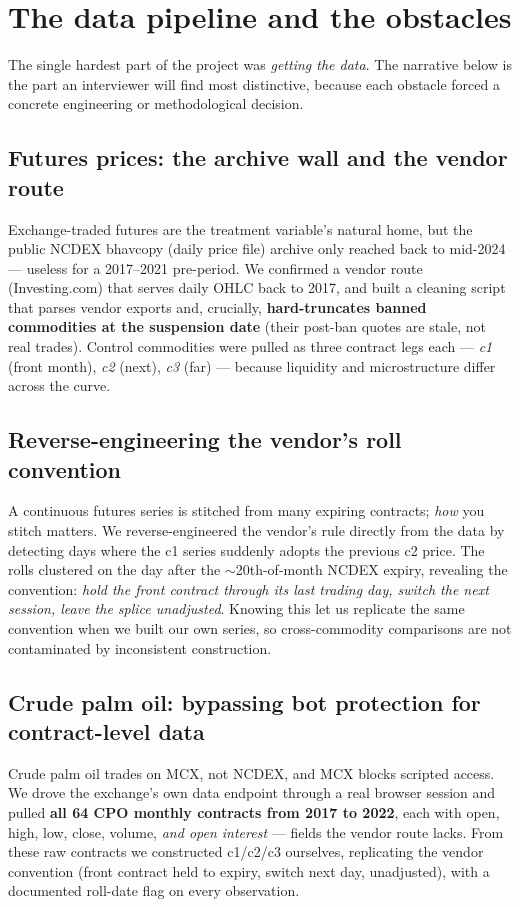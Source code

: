 \documentclass[11pt]{article}
\begin{document}
\section{The data pipeline and the obstacles}
The single hardest part of the project was \emph{getting the data}. The narrative below is
the part an interviewer will find most distinctive, because each obstacle forced a concrete
engineering or methodological decision.

\subsection{Futures prices: the archive wall and the vendor route}
Exchange-traded futures are the treatment variable's natural home, but the public NCDEX
bhavcopy (daily price file) archive only reached back to mid-2024 --- useless for a
2017--2021 pre-period. We confirmed a vendor route (Investing.com) that serves daily OHLC
back to 2017, and built a cleaning script that parses vendor exports and, crucially,
\textbf{hard-truncates banned commodities at the suspension date} (their post-ban quotes are
stale, not real trades). Control commodities were pulled as three contract legs each ---
\emph{c1} (front month), \emph{c2} (next), \emph{c3} (far) --- because liquidity and
microstructure differ across the curve.

\subsection{Reverse-engineering the vendor's roll convention}
A continuous futures series is stitched from many expiring contracts; \emph{how} you stitch
matters. We reverse-engineered the vendor's rule directly from the data by detecting days
where the c1 series suddenly adopts the previous c2 price. The rolls clustered on the day
after the $\sim$20th-of-month NCDEX expiry, revealing the convention: \emph{hold the front
contract through its last trading day, switch the next session, leave the splice
unadjusted}. Knowing this let us replicate the same convention when we built our own series,
so cross-commodity comparisons are not contaminated by inconsistent construction.

\subsection{Crude palm oil: bypassing bot protection for contract-level data}
Crude palm oil trades on MCX, not NCDEX, and MCX blocks scripted access. We drove the
exchange's own data endpoint through a real browser session and pulled \textbf{all 64 CPO
monthly contracts from 2017 to 2022}, each with open, high, low, close, volume, \emph{and
open interest} --- fields the vendor route lacks. From these raw contracts we constructed
c1/c2/c3 ourselves, replicating the vendor convention (front contract held to expiry, switch
next day, unadjusted), with a documented roll-date flag on every observation.
\end{document}
